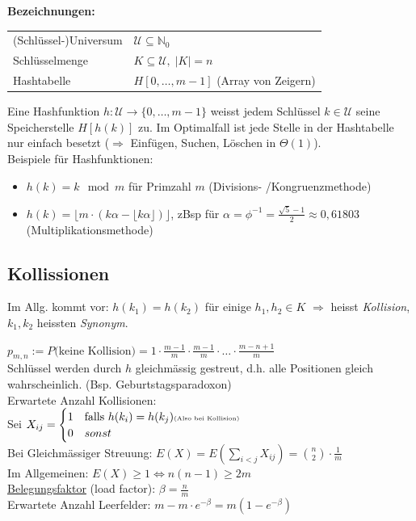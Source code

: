 \documentclass{scrartcl}
\begin{document}
\begin{shaded}
\textbf{Bezeichnungen:} \\
\begin{tabular}{ll}
(Schlüssel-)Universum &$\mathcal{U} \subseteq \mathds{N}_0$ \\
Schlüsselmenge & $K \subseteq \mathcal{U}, \; \vert K \vert = n$ \\
Hashtabelle & $H[0,\ldots, m-1]$ (Array von Zeigern) \\
\end{tabular}
\end{shaded}
Eine Hashfunktion $h: \mathcal{U} \to \{0,\ldots,m-1\}$ weisst jedem Schlüssel $k\in\mathcal{U}$ seine Speicherstelle $H[h(k)]$ zu. Im Optimalfall ist jede Stelle in der Hashtabelle nur einfach besetzt ($\Rightarrow$ Einfügen, Suchen, Löschen in $\Theta(1)$). \\
Beispiele für Hashfunktionen:
\begin{itemize}
	\item $h(k) = k \mod m$ \; für Primzahl $m$ (Divisions- /Kongruenzmethode)
	\item $h(k) = \lfloor m\cdot(k\alpha-\lfloor k\alpha\rfloor)\rfloor$, zBsp für $\alpha=\phi^{-1}=\frac{\sqrt{5}-1}{2}\approx 0,61803$ \; (Multiplikationsmethode)
\end{itemize}

\subsection{Kollissionen}
Im Allg. kommt vor: $h(k_1)=h(k_2)$ für einige $h_1,h_2\in K$ $\Rightarrow$ heisst \emph{Kollision}, $k_1,k_2$ heissten \emph{Synonym}.
\begin{shaded}
$p_{m,n} := P \textrm{(keine Kollision)} = 1\cdot\frac{m-1}{m}\cdot\frac{m-1}{m}\cdot\ldots\cdot\frac{m-n+1}{m}$ \\
Schlüssel werden durch $h$ gleichmässig gestreut, d.h. alle Positionen gleich wahrscheinlich. (Bsp. Geburtstagsparadoxon) \\ \vspace{2em}
Erwartete Anzahl Kollisionen: \\
Sei $X_{ij}=
\begin{cases}
1 & \textrm{falls } h(k_i)=h(k_j) \textrm{\tiny (Also bei Kollision)} \\
0 & sonst
\end{cases}$\\
Bei Gleichmässiger Streuung: $E(X)=E\left(\sum_{i<j}X_{ij}\right)=\binom{n}{2}\cdot\frac{1}{m}$ \\
Im Allgemeinen: $E(X)\geq 1 \Leftrightarrow n(n-1)\geq 2m$ \\ \vspace{2em}
\underline{Belegungsfaktor} (load factor): $\beta = \frac{n}{m}$\\
Erwartete Anzahl Leerfelder: $m-m\cdot e^{-\beta} = m(1-e^{-\beta})$
\end{shaded}
\end{document}
